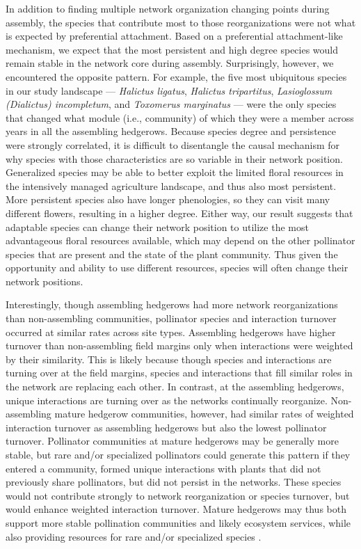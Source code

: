 \documentclass[12pt]{article}
\begin{document}
In addition to finding multiple network organization changing points
during assembly, the species that contribute most to those
reorganizations were not what is expected by preferential
attachment. Based on a preferential attachment-like mechanism, we
expect that the most persistent and high degree species would remain
stable in the network core during assembly. Surprisingly, however, we
encountered the opposite pattern. For example, the five most
ubiquitous species in our study landscape --- \textit{Halictus
  ligatus}, \textit{Halictus tripartitus}, \textit{Lasioglossum
  (Dialictus) incompletum}, and \textit{Toxomerus marginatus} --- were
the only species that changed what module (i.e., community) of which
they were a member across years in all the assembling
hedgerows. Because species degree and persistence were strongly
correlated, it is difficult to disentangle the causal mechanism for
why species with those characteristics are so variable in their
network position. Generalized species may be able to better exploit
the limited floral resources in the intensively managed agriculture
landscape, and thus also most persistent. More persistent species also
have longer phenologies, so they can visit many different flowers,
resulting in a higher degree. Either way, our result suggests that
adaptable species can change their network position to utilize the
most advantageous floral resources available, which may depend on the
other pollinator species that are present and the state of the plant
community. Thus given the opportunity and ability to use different
resources, species will often change their network positions.

Interestingly, though assembling hedgerows had more network
reorganizations than non-assembling communities, pollinator species
and interaction turnover occurred at similar rates across site types.
Assembling hedgerows have higher turnover than non-assembling field
margins only when interactions were weighted by their similarity. This
is likely because though species and interactions are turning over at
the field margins, species and interactions that fill similar roles in
the network are replacing each other. In contrast, at the assembling
hedgerows, unique interactions are turning over as the networks
continually reorganize. Non-assembling mature hedgerow communities,
however, had similar rates of weighted interaction turnover as
assembling hedgerows but also the lowest pollinator
turnover. Pollinator communities at mature hedgerows may be generally
more stable, but rare and/or specialized pollinators could generate
this pattern if they entered a community, formed unique interactions
with plants that did not previously share pollinators, but did not
persist in the networks. These species would not contribute strongly
to network reorganization or species turnover, but would enhance
weighted interaction turnover. Mature hedgerows may thus both support
more stable pollination communities and likely ecosystem services,
while also providing resources for rare and/or specialized species
\citep{kremen-2015-602, mgonigle-2015-x}.
\end{document}
